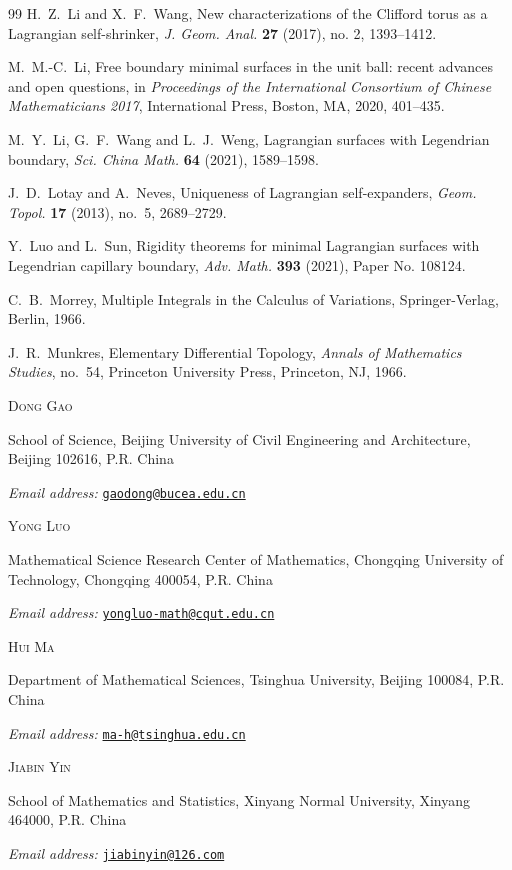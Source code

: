 \documentclass[11pt,a4paper]{article}
\numberwithin{equation}{section}
\newcommand{\authorinfo}[3]{%
  \par\addvspace{0.6\baselineskip}%
  \noindent\textsc{#1}\par
  \noindent #2\par
  \noindent\textit{Email address:}
  \href{mailto:#3}{\texttt{#3}}\par
}
\begin{document}
\begin{thebibliography}{99}
H.~Z.~Li and X.~F.~Wang,
New characterizations of the Clifford torus as a Lagrangian self-shrinker,
\emph{J. Geom. Anal.} \textbf{27} (2017), no. 2, 1393--1412.

M.~M.-C.~Li, Free boundary minimal surfaces in the unit ball: recent advances and open questions,
in \emph{Proceedings of the International Consortium of Chinese Mathematicians 2017}, International Press, Boston, MA, 2020, 401--435. 

M.~Y.~Li, G.~F.~Wang and L.~J.~Weng,
Lagrangian surfaces with Legendrian boundary,
\emph{Sci. China Math.} \textbf{64} (2021), 1589--1598.

J.~D.~Lotay and A.~Neves,
Uniqueness of Lagrangian self-expanders,
\emph{Geom. Topol.} \textbf{17} (2013), no.~5, 2689--2729.

Y.~Luo and L.~Sun,
Rigidity theorems for minimal Lagrangian surfaces with Legendrian capillary boundary,
\emph{Adv. Math.} \textbf{393} (2021), Paper No. 108124.

C.~B.~Morrey,
Multiple Integrals in the Calculus of Variations,
Springer-Verlag, Berlin, 1966.

J.~R.~Munkres, 
Elementary Differential Topology, \emph{Annals of Mathematics Studies}, no.~54, Princeton University Press, Princeton, NJ, 1966.

\end{thebibliography}

\begingroup
\small
\raggedright
\authorinfo
  {Dong Gao}
  {School of Science, Beijing University of Civil Engineering and Architecture,
   Beijing 102616, P.R. China}
  {gaodong@bucea.edu.cn}
\authorinfo
  {Yong Luo}
  {Mathematical Science Research Center of Mathematics,
   Chongqing University of Technology, Chongqing 400054, P.R. China}
  {yongluo-math@cqut.edu.cn}
\authorinfo
  {Hui Ma}
  {Department of Mathematical Sciences, Tsinghua University,
   Beijing 100084, P.R. China}
  {ma-h@tsinghua.edu.cn}
\authorinfo
  {Jiabin Yin}
  {School of Mathematics and Statistics, Xinyang Normal University,
   Xinyang 464000, P.R. China}
  {jiabinyin@126.com}
\endgroup
\end{document}
